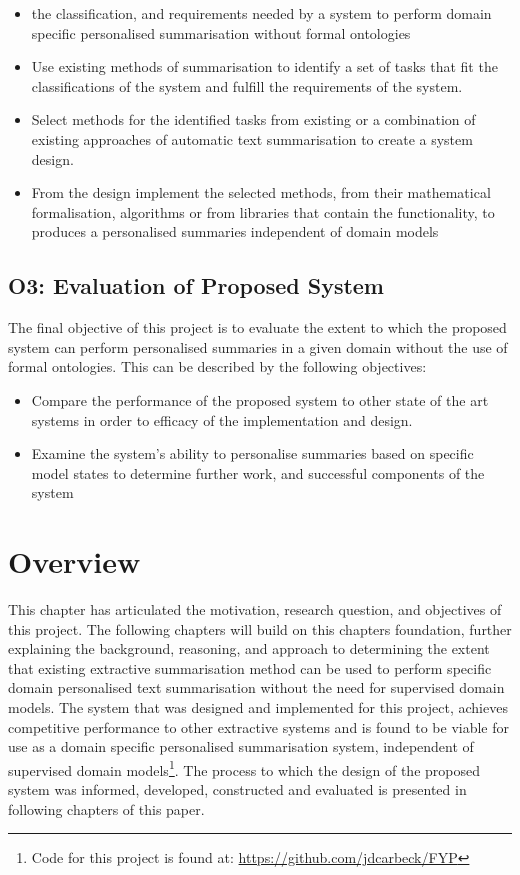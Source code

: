 \begin{itemize}
    \item the classification, and requirements needed by a system to perform domain specific personalised summarisation without formal ontologies
    \item Use existing methods of summarisation to identify a set of tasks that fit the classifications of the system and fulfill the requirements of the system.
    \item Select methods for the identified tasks from existing or a combination of existing approaches of automatic text summarisation to create a system design.
    \item From the design implement the selected methods, from their mathematical formalisation, algorithms or from libraries that contain the functionality, to produces a personalised summaries independent of domain models
\end{itemize}

\subsection*{O3: Evaluation of Proposed System}

The final objective of this project is to evaluate the extent to which the proposed system can perform personalised summaries in a given domain without the use of formal ontologies. This can be described by the following objectives:

\begin{itemize}
    \item Compare the performance of the proposed system to other state of the art systems in order to efficacy of the implementation and design.
    \item Examine the system's ability to personalise summaries based on specific model states to determine further work, and successful components of the system
\end{itemize}

\section{Overview}
This chapter has articulated the motivation, research question, and objectives of this project. The following chapters will build on this chapters foundation, further explaining the background, reasoning, and approach to determining the extent that existing extractive summarisation method can be used to perform specific domain personalised text summarisation without the need for supervised domain models. The system that was designed and implemented for this project, achieves competitive performance to other extractive systems and is found to be viable for use as a domain specific personalised summarisation system, independent of supervised domain models\footnote{Code for this project is found at: \url{https://github.com/jdcarbeck/FYP}}. The process to which the design of the proposed system was informed, developed, constructed and evaluated is presented in following chapters of this paper.

